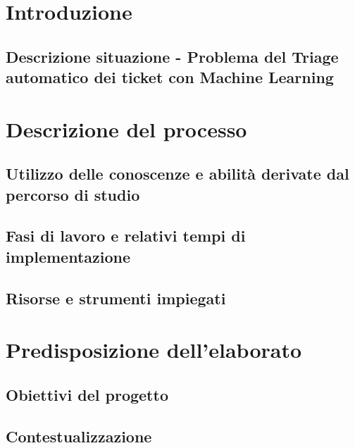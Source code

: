 \documentclass[12pt,a4paper,oneside]{book}
\begin{document}


\frontmatter
\tableofcontents
\listoffigures

\mainmatter

\setcounter{chapter}{-1}
\chapter[Parte Zero - Introduzione]{Introduzione}
\section[Descrizione situazione - Triage automatico dei ticket con Machine Learning]{Descrizione situazione - Problema del Triage \\ automatico dei ticket con Machine Learning}

\chapter[Parte Prima - Descrizione del processo]{Descrizione del processo} 
\section{Utilizzo delle conoscenze e abilità derivate dal percorso di studio}
 
\section{Fasi di lavoro e relativi tempi di implementazione}

\section{Risorse e strumenti impiegati}
  

\chapter[Parte Seconda - Predisposizione dell'elaborato]{Predisposizione dell'elaborato}
\section{Obiettivi del progetto}
  
\section{Contestualizzazione}
 
\end{document}
